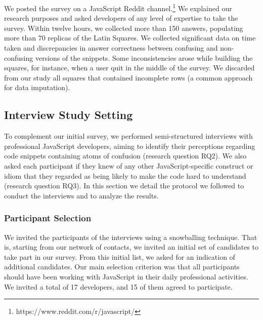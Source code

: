 We posted the survey on a JavaScript Reddit channel.\footnote{https://www.reddit.com/r/javascript/} We explained our research purposes and asked developers of any level of expertise to take the survey. Within twelve hours, we collected more than 150 answers, populating more than 70 replicas of the Latin Squares. We collected significant data on time taken and discrepancies in answer correctness between confusing and non-confusing versions of the snippets. Some inconsistencies arose while building the squares, for instance, when a user quit in the middle of the survey. We discarded from our study all squares that contained incomplete rows (a common approach for data imputation).

 
\subsection{Interview Study Setting}

To complement our initial survey, we performed semi-structured interviews with professional JavaScript developers, aiming to identify their perceptions regarding code snippets containing atoms of confusion (research question RQ2). We also asked each participant if they knew of any other JavaScript-specific construct or idiom that they regarded as being likely to make the code hard to understand (research question RQ3). In this section we detail the protocol we followed to conduct the interviews and to analyze the results.


\subsubsection*{Participant Selection} We invited the participants of the interviews using a snowballing technique. That is, starting from our network of contacts, we invited an initial set of candidates to take part in our survey. From this initial list, we asked for an indication of additional candidates. Our main selection criterion was that all participants should have been working with JavaScript in their daily professional activities. We invited a total of 17 developers, and 15 of them agreed to participate.   



